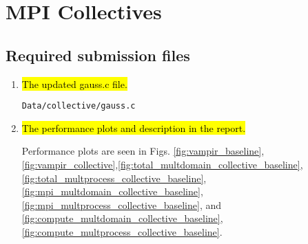 
\section{MPI Collectives}
\subsection{Required submission files}
\begin{enumerate}
	\item \hl{The updated gauss.c file.}
	
	\verb!Data/collective/gauss.c!

	\item \hl{The performance plots and description in the report.}
		
	Performance plots are seen in Figs. \ref{fig:vampir_baseline}, \ref{fig:vampir_collective},\ref{fig:total_multdomain_collective_baseline}, \ref{fig:total_multprocess_collective_baseline}, \ref{fig:mpi_multdomain_collective_baseline},
	\ref{fig:mpi_multprocess_collective_baseline}, and \ref{fig:compute_multdomain_collective_baseline},
	\ref{fig:compute_multprocess_collective_baseline}. 

\end{enumerate}

